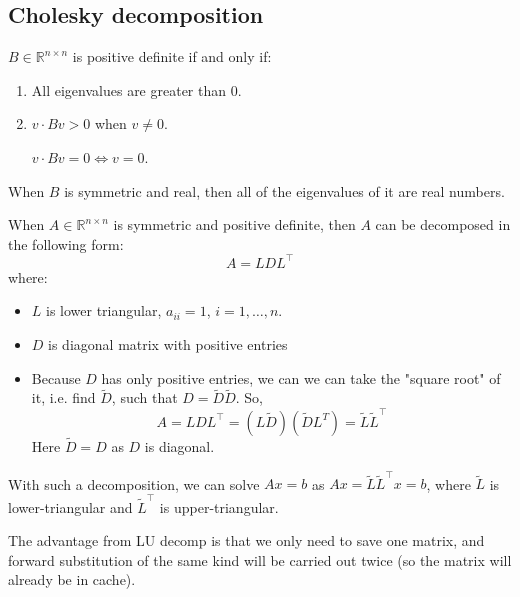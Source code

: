\subsection{Cholesky decomposition}

\begin{definition}
    $B \in \mathbb{R}^{n \times n}$ is positive definite if and only if:
    \begin{enumerate}
        \item {
            All eigenvalues are greater than 0.
        }
        \item {
            $v \cdot Bv > 0$ when $v \ne 0$.

            $v \cdot Bv = 0 \Longleftrightarrow v = 0$.
        }
    \end{enumerate}
\end{definition}

\begin{statement}
    When $B$ is symmetric and real, then all of the eigenvalues of it are real numbers.
\end{statement}

\begin{definition}
    When $A \in \mathbb{R}^{n \times n}$ is symmetric and positive definite,
    then $A$ can be decomposed in the following form:
    \[ A = LDL^\intercal \]
    where:
    \begin{itemize}
        \item {
            $L$ is lower triangular, $a_{ii} = 1$, $i = 1, \dots, n$.
        }
        \item {
            $D$ is diagonal matrix with positive entries
        }
        \item {
            Because $D$ has only positive entries, we can we can 
            take the "square root" of it, i.e. find $\tilde{D}$, such that
            $D = \tilde{D} \tilde{D}$.
            So,
            \[ A = L D L^\intercal = (L\tilde{D}) (\tilde{D} L^T) = \tilde{L} \tilde{L}^\intercal \]
            Here $\tilde{D} = D$ as $D$ is diagonal.
        }
    \end{itemize}
\end{definition}

With such a decomposition, we can solve $Ax = b$ as
$Ax = \tilde{L} \tilde{L}^\intercal x = b$, where
$\tilde{L}$ is lower-triangular and $\tilde{L}^\intercal$ is upper-triangular.

The advantage from LU decomp is that we only need to save one matrix,
and forward substitution of the same kind will be carried out twice (so the matrix
will already be in cache).

